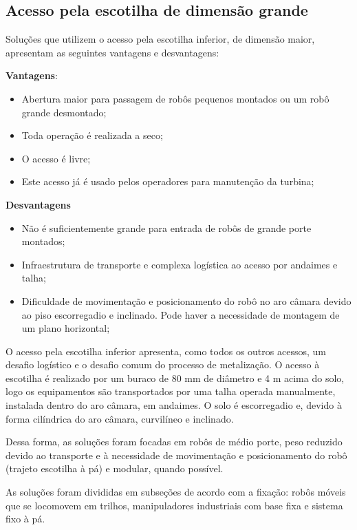 \subsection{Acesso pela escotilha de dimensão grande}
Soluções que utilizem o acesso pela escotilha inferior, de dimensão maior,
apresentam as seguintes vantagens e desvantagens:

\textbf{Vantagens}:
\begin{itemize}
  \item Abertura maior para passagem de robôs pequenos montados ou um robô
  grande desmontado;
  \item Toda operação é realizada a seco;
  \item O acesso é livre;
  \item Este acesso já é usado pelos operadores para manutenção da turbina;
\end{itemize}

\textbf{Desvantagens}
\begin{itemize}
  \item Não é suficientemente grande para entrada de robôs de grande
  porte montados;
  \item Infraestrutura de transporte e complexa logística ao acesso por
  andaimes e talha;
  \item Dificuldade de movimentação e posicionamento do robô no aro câmara
  devido ao piso escorregadio e inclinado. Pode haver a necessidade de montagem
  de um plano horizontal; 
\end{itemize}

O acesso pela escotilha inferior apresenta, como todos os outros
acessos, um desafio logístico e o desafio comum do processo de metalização. O
acesso à escotilha é realizado por um buraco de 80 mm de diâmetro e 4 m acima do
solo, logo os equipamentos são transportados por uma talha operada manualmente,
instalada dentro do aro câmara, em andaimes. O solo é escorregadio e, devido à
forma cilíndrica do aro câmara, curvilíneo e inclinado.

Dessa forma, as soluções foram focadas em robôs de médio porte, peso reduzido
devido ao transporte e à necessidade de movimentação e posicionamento do robô
(trajeto escotilha à pá) e modular, quando possível.

As soluções foram divididas em subseções de acordo com a fixação: robôs móveis
que se locomovem em trilhos, manipuladores industriais com base fixa e sistema
fixo à pá. 




 
